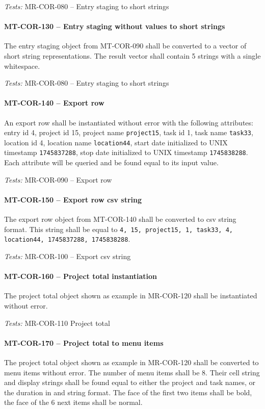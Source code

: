 \textit{Tests: } MR-COR-080 -- Entry staging to short strings

\paragraph{MT-COR-130 -- Entry staging without values to short strings}
The entry staging object from MT-COR-090 shall be converted to
a vector of short string representations. The result vector shall
contain 5 strings with a single whitespace.

\textit{Tests: } MR-COR-080 -- Entry staging to short strings

\paragraph{MT-COR-140 -- Export row}
An export row shall be instantiated without error with the following
attributes: entry id 4, project id 15, project name \lstinline{project15},
task id 1, task name \lstinline{task33}, location id 4, location name
\lstinline{location44}, start date initialized to UNIX timestamp
\lstinline{1745837288}, stop date initialized to UNIX timestamp
\lstinline{1745838288}.
Each attribute will be queried and be found equal to its input value.

\textit{Tests: } MR-COR-090 -- Export row

\paragraph{MT-COR-150 -- Export row csv string}
The export row object from MT-COR-140 shall be converted to csv string
format. This string shall be equal to
\lstinline{4, 15, project15, 1, task33, 4, location44, 1745837288, 1745838288}.

\textit{Tests: } MR-COR-100 -- Export csv string

\paragraph{MT-COR-160 -- Project total instantiation}
The project total object shown as example in MR-COR-120 shall
be instantiated without error.

\textit{Tests: } MR-COR-110 Project total

\paragraph{MT-COR-170 -- Project total to menu items}
The project total object shown as example in MR-COR-120 shall
be converted to menu items without error.
The number of menu items shall be 8.
Their cell string and display strings shall be found equal
to either the project and task names, or the duration in
and string format. The face of the first two items shall
be bold, the face of the 6 next items shall be normal.

